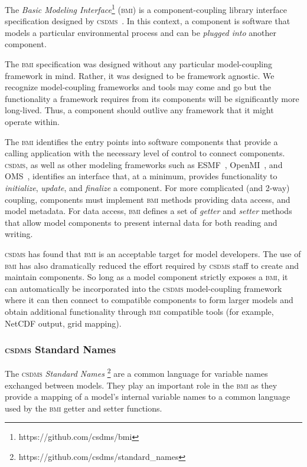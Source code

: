 \documentclass[11pt, oneside]{amsart}
\DeclareRobustCommand{\csdms}{\textsc{csdms}}
\DeclareRobustCommand{\bmi}{\textsc{bmi}}
\begin{document}
The \emph{Basic Modeling Interface}\footnote{https://github.com/csdms/bmi}
(\bmi{}) is a component-coupling library
interface specification designed by \csdms~\cite{peckham2012component,
syvitski2014plug}.  In this context, a component is software that models a
particular environmental process and can be \emph{plugged into} another
component.

The \bmi{} specification was designed without any particular model-coupling
framework in mind.  Rather, it was designed to be framework agnostic. We
recognize model-coupling frameworks and tools may come and go but the
functionality a framework requires from its components will be significantly
more long-lived. Thus, a component should outlive any framework that it might
operate within.

The \bmi{} identifies the entry points into software components that provide a
calling application with the necessary level of control to connect components.
\csdms{}, as well as other modeling frameworks such as
ESMF~\cite{hill2004architecture}, OpenMI~\cite{gregersen2007openmi}, and
OMS~\cite{david2002object}, identifies an interface that, at a minimum,
provides functionality to \emph{initialize}, \emph{update}, and
\emph{finalize} a component. For more complicated (and 2-way)
coupling, components must implement \bmi{} methods providing data access,
and model metadata. For data access, \bmi{} defines a set of \emph{getter}
and \emph{setter} methods that allow model components to present internal data
for both reading and writing.

\csdms{} has found that \bmi{} is an acceptable target for model developers.
The use of \bmi{} has also dramatically reduced the effort required by
\csdms{} staff to create and maintain components. So long as a model component
strictly exposes a \bmi{}, it can automatically be incorporated into the
\csdms{} model-coupling framework where it can then connect to compatible
components to form larger models and obtain additional functionality through
\bmi{} compatible tools (for example, NetCDF output, grid mapping).

\subsubsection{\csdms{} Standard Names}
\label{sec:standardnames}

The \csdms{} \emph{Standard Names}
\footnote{https://github.com/csdms/standard\_names}
are a common language for variable names exchanged between models. They play
an important role in the \bmi{} as they provide a mapping of a model's
internal variable names to a common language used by the \bmi{} getter and
setter functions.
\end{document}

